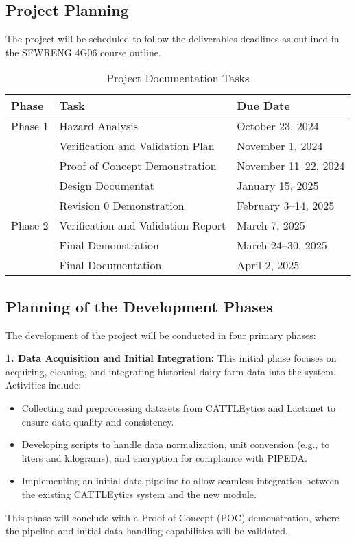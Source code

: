 \documentclass[12pt]{article}
\begin{document}
\subsection{Project Planning}

The project will be scheduled to follow the deliverables deadlines as outlined
in the SFWRENG 4G06 course outline.

\begin{table}[h]
	\centering
	\caption{Project Documentation Tasks}
	\vspace{5pt}
	\begin{tabular}{|p{}|p{}|p{}|}
		\hline
		\textbf{Phase} & \textbf{Task}                      & \textbf{Due Date}
		\\
		\hline
		Phase 1        & Hazard Analysis                    & October 23, 2024
		\\
		\cline{2-3}    & Verification and Validation Plan   & November 1, 2024
		\\
		\cline{2-3}    & Proof of Concept Demonstration     & November 11--22, 
        2024
		\\
		\cline{2-3}    & Design Documentat                  & January 15, 2025
		\\
		\cline{2-3}    & Revision 0 Demonstration           & February 3--14, 
        2025
		\\
		\hline
		Phase 2        & Verification and Validation Report & March 7, 2025
		\\
		\cline{2-3}    & Final Demonstration                & March 24--30, 2025
		\\
		\cline{2-3}    & Final Documentation                & April 2, 2025
		\\
		\hline
	\end{tabular}

	\label{project_tasks}
\end{table}

\subsection{Planning of the Development Phases}
The development of the project will be conducted in four primary phases:

\textbf{1. Data Acquisition and Initial Integration:} This initial phase focuses
on acquiring, cleaning, and integrating historical dairy farm data into the
system. Activities include:
\begin{itemize}
    \item Collecting and preprocessing datasets from CATTLEytics and Lactanet to
    ensure data quality and consistency.
    \item Developing scripts to handle data normalization, unit conversion
    (e.g., to liters and kilograms), and encryption for compliance with PIPEDA.
    \item Implementing an initial data pipeline to allow seamless integration
    between the existing CATTLEytics system and the new module.
\end{itemize}
This phase will conclude with a Proof of Concept (POC) demonstration, where the
pipeline and initial data handling capabilities will be validated.
\end{document}
